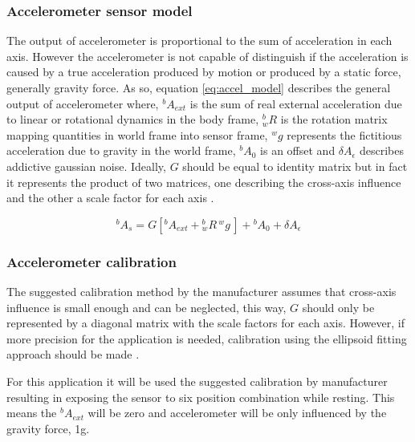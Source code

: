 \subsubsection{Accelerometer sensor model}\label{subsubsection:adxl345model}

The output of accelerometer is proportional to the sum of acceleration in each
axis. However the accelerometer is not capable of distinguish if the
acceleration is caused by a true acceleration produced by motion or produced by
a static force, generally gravity force. As so, equation \eqref{eq:accel_model}
describes the general output of accelerometer \cite{Vectornav_calibration}
where, ${}^bA_{ext}$ is the sum of real external acceleration due to
linear or rotational dynamics in the body frame, ${}^b_wR$ is the rotation
matrix mapping quantities in world frame into sensor frame, ${}^wg $
represents the fictitious acceleration due to gravity in the world frame, ${}^bA_{0}$ is an offset and
$\delta A_{\epsilon}$ describes addictive gaussian noise.
Ideally, $G$ should be equal to identity matrix but in fact it represents the
product of two matrices, one describing the cross-axis influence and the other
a scale factor for each axis \cite{Vectornav_calibration}.

\begin{equation}
{}^bA_{s}=G[{}^bA_{ext} + {}^b_wR\,{}^wg\,] + {}^bA_{0} + \delta A_{\epsilon}
\label{eq:accel_model}
\end{equation}

\subsubsection{Accelerometer calibration}\label{subsubsection:adxl345calibration}

The suggested calibration method by the manufacturer \cite{adxl345AN1077}
assumes that cross-axis influence is small enough and can be neglected, this
way, $G$ should only be represented by a diagonal matrix with the scale factors
for each axis. However, if more precision for the application is needed,
calibration using the ellipsoid fitting approach should be made
\cite{Pylvanainen2008}.

For this application it will be used the suggested calibration by manufacturer
resulting in exposing the sensor to six position combination while resting. This
means the ${}^bA_{ext}$ will be zero and accelerometer will be only
influenced by the gravity force, 1g.

